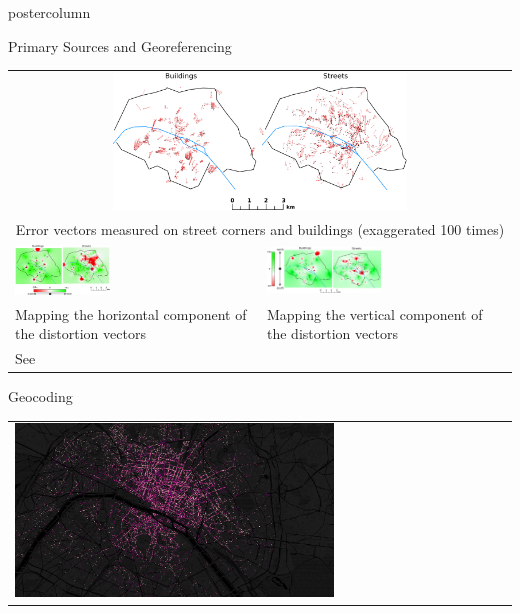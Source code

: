 \documentclass[final,hyperref={pdfpagelabels=false}]{beamer}
\let\oldcite=\cite
\renewcommand{\cite}[1]{\textcolor{ta3chameleon}{\oldcite{#1}}}
\begin{document}
\begin{frame}
\begin{columns}
\begin{column}{0.5\textwidth}
\begin{beamercolorbox}[center,wd=\textwidth]{postercolumn}
\begin{minipage}[t]{.98\textwidth}
\begin{block}{Primary Sources and Georeferencing}
\begin{tabular}{p{}p{}}
          \multicolumn{2}{c}{\includegraphics[width=0.6\textwidth]{figures/errorthemes.png}}\\
	  \multicolumn{2}{c}{Error vectors measured on street corners and buildings (exaggerated 100 times)}\\
          \vspace{0pt}
          \includegraphics[width=0.4\textwidth]{figures/error_x.png}&
          \vspace{0pt}
          \includegraphics[width=0.48\textwidth]{figures/error_y.png}\\
	  Mapping the horizontal component of the distortion vectors&Mapping the vertical component of the distortion vectors\\
	  See \cite{Dumenieu2013a,Dumenieu2015PhD,Dumenieu2018}
        \end{tabular}
      \end{block}
      \begin{block}{Geocoding}
        \begin{tabular}{>{\centering}m{}}
          \includegraphics[width=0.65\textwidth]{figures/geocoding}\\

\end{tabular}
\end{block}
\end{minipage}
\end{beamercolorbox}
\end{column}
\end{columns}
\end{frame}
\end{document}

